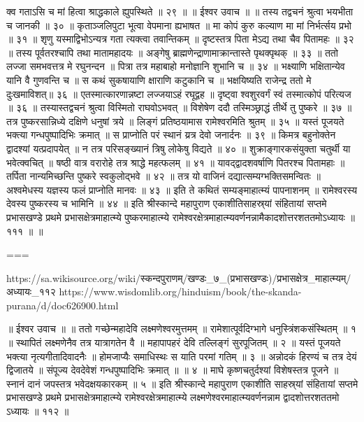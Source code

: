 क्व गताऽसि च मां हित्वा श्राद्धकाले ह्युपस्थिते ॥ २९ ॥
॥ ईश्वर उवाच ॥ ॥
तस्य तद्वचनं श्रुत्वा भयभीता च जानकी ॥ ३० ॥
कृताञ्जलिपुटा भूत्वा वेपमाना ह्यभाषत ॥
मा कोपं कुरु कल्याण मा मां निर्भर्त्सय प्रभो ॥ ३१ ॥
शृणु यस्माद्विभोऽन्यत्र गता त्यक्त्वा तवान्तिकम् ॥
दृष्टस्तत्र पिता मेऽद्य तथा चैव पितामहः ॥ ३२ ॥
तस्य पूर्वतरश्चापि तथा मातामहादयः ॥
अङ्गेषु ब्राह्मणेन्द्राणामाक्रान्तास्ते पृथक्पृथक् ॥ ३३ ॥
ततो लज्जा समभवत्तत्र मे रघुनन्दन ॥
पित्रा तत्र महाबाहो मनोज्ञानि शुभानि च ॥ ३४ ॥
भक्ष्याणि भक्षितान्येव यानि वै गुणवन्ति च ॥
स कथं सुकषायाणि क्षाराणि कटुकानि च ॥
भक्षयिष्यति राजेन्द्र ततो मे दुःखमाविशत्॥ ३६ ॥
एतस्मात्कारणान्नष्टा लज्जयाऽहं रघूद्वह ॥
दृष्ट्वा श्वशुरवर्गं स्वं तस्मात्कोपं परित्यज ॥ ३६ ॥
तस्यास्तद्वचनं श्रुत्वा विस्मितो राघवोऽभवत् ॥
विशेषेण ददौ तस्मिञ्छ्राद्धं तीर्थे तु पुष्करे ॥ ३७ ॥
तत्र पुष्करसान्निध्ये दक्षिणे धनुषां त्रये ॥
लिङ्गं प्रतिष्ठयामास रामेश्वरमिति श्रुतम् ॥ ३५ ॥
यस्तं पूजयते भक्त्या गन्धपुष्पादिभिः क्रमात् ॥
स प्राप्नोति परं स्थानं य्रत्र देवो जनार्दनः ॥ ३९ ॥
किमत्र बहुनोक्तेन द्वादश्यां यत्प्रदापयेत् ॥
न तत्र परिसङ्ख्यानं त्रिषु लोकेषु विद्यते ॥ ४० ॥
शुक्राङ्गारकसंयुक्ता चतुर्थी या भवेत्क्वचित् ॥
षष्ठी वात्र वरारोहे तत्र श्राद्धे महत्फलम् ॥ ४१ ॥
यावद्द्वादशवर्षाणि पितरश्च पितामहाः ॥
तर्पिता नान्यमिच्छन्ति पुष्करे स्वकुलोद्भवे ॥ ४२ ॥
तत्र यो वाजिनं दद्यात्सम्यग्भक्तिसमन्वितः ॥
अश्वमेधस्य यज्ञस्य फलं प्राप्नोति मानवः ॥ ४३ ॥
इति ते कथितं सम्यङ्माहात्म्यं पापनाशनम् ॥
रामेश्वरस्य देवस्य पुष्करस्य च भामिनि ॥ ४४ ॥
इति श्रीस्कान्दे महापुराण एकाशीतिसाहस्र्यां संहितायां सप्तमे प्रभासखण्डे प्रथमे प्रभासक्षेत्रमाहात्म्ये पुष्करमाहात्म्ये रामेश्वरक्षेत्रमाहात्म्यवर्णनन्नामैकादशोत्तरशततमोऽध्यायः ॥ १११ ॥ ॥

===

https://sa.wikisource.org/wiki/स्कन्दपुराणम्/खण्डः_७_(प्रभासखण्डः)/प्रभासक्षेत्र_माहात्म्यम्/अध्यायः_११२
https://www.wisdomlib.org/hinduism/book/the-skanda-purana/d/doc626900.html


॥ ईश्वर उवाच ॥ ॥
ततो गच्छेन्महादेवि लक्ष्मणेश्वरमुत्तमम् ॥
रामेशात्पूर्वदिग्भागे धनुस्त्रिंशकसंस्थितम् ॥ १ ॥
स्थापितं लक्ष्मणेनैव तत्र यात्रागतेन वै ॥
महापापहरं देवि तल्लिङ्गं सुरपूजितम् ॥ २ ॥
यस्तं पूजयते भक्त्या नृत्यगीतादिवादनैः ॥
होमजाप्यैः समाधिस्थः स याति परमां गतिम् ॥ ३ ॥
अन्नोदकं हिरण्यं च तत्र देयं द्विजातये ॥
संपूज्य देवदेवेशं गन्धपुष्पादिभिः क्रमात् ॥ ॥ ४ ॥
माघे कृष्णचतुर्दश्यां विशेषस्तत्र पूजने ॥
स्नानं दानं जपस्तत्र भवेदक्षयकारकम् ॥ ५ ॥
इति श्रीस्कान्दे महापुराण एकाशीति साहस्र्यां संहितायां सप्तमे प्रभासखण्डे प्रथमे प्रभासक्षेत्रमाहात्म्ये रामेश्वरक्षेत्रमाहात्म्ये लक्ष्मणेश्वरमाहात्म्यवर्णनन्नाम द्वादशोत्तरशततमो ऽध्यायः ॥ ११२ ॥


